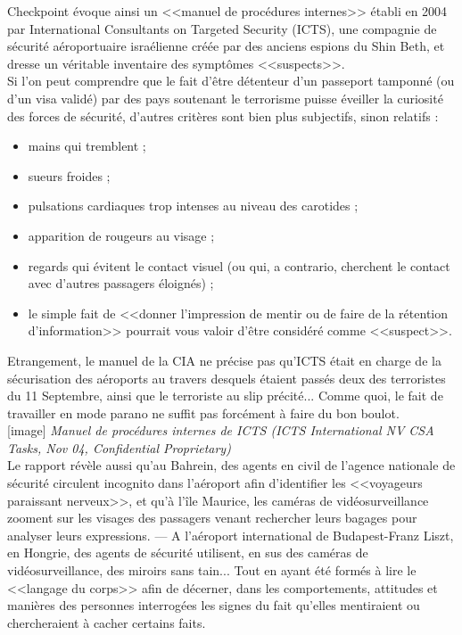 \documentclass[11pt,twoside,a4paper]{article}
\begin{document}
Checkpoint {\'e}voque ainsi un <<manuel de proc{\'e}dures internes>> {\'e}tabli en 2004 par International Consultants on Targeted Security (ICTS), une compagnie de s{\'e}curit{\'e} a{\'e}roportuaire isra{\'e}lienne cr{\'e}{\'e}e par des anciens espions du Shin Beth, et dresse un v{\'e}ritable inventaire des sympt{\^o}mes <<suspects>>. ~\\

Si l'on peut comprendre que le fait d'{\^e}tre d{\'e}tenteur d'un passeport tamponn{\'e} (ou d'un visa valid{\'e}) par des pays soutenant le terrorisme puisse {\'e}veiller la curiosit{\'e} des forces de s{\'e}curit{\'e}, d'autres crit{\`e}res sont bien plus subjectifs, sinon relatifs :
\begin{itemize}
	\item mains qui tremblent ;
	\item sueurs froides ;
	\item pulsations cardiaques trop intenses au niveau des carotides ;
	\item apparition de rougeurs au visage ;
	\item regards qui {\'e}vitent le contact visuel (ou qui, a contrario, cherchent le contact avec d'autres passagers {\'e}loign{\'e}s) ;
	\item le simple fait de <<donner l'impression de mentir ou de faire de la r{\'e}tention d'information>> pourrait vous valoir d'{\^e}tre consid{\'e}r{\'e} comme <<suspect>>.
\end{itemize}

Etrangement, le manuel de la CIA ne pr{\'e}cise pas qu'ICTS {\'e}tait en charge de la s{\'e}curisation des a{\'e}roports au travers desquels {\'e}taient pass{\'e}s deux des terroristes du 11 Septembre, ainsi que le terroriste au slip pr{\'e}cit{\'e}... Comme quoi, le fait de travailler en mode parano ne suffit pas forc{\'e}ment {\`a} faire du bon boulot. ~\\

[image]
\emph{Manuel de proc{\'e}dures internes de ICTS (ICTS International NV CSA Tasks, Nov 04, Confidential Proprietary)} ~\\

Le rapport r{\'e}v{\`e}le aussi qu'au Bahrein, des agents en civil de l'agence nationale de s{\'e}curit{\'e} circulent incognito dans l'a{\'e}roport afin d'identifier les <<voyageurs paraissant nerveux>>, et qu'{\`a} l'{\^i}le Maurice, les cam{\'e}ras de vid{\'e}osurveillance zooment sur les visages des passagers venant rechercher leurs bagages pour analyser leurs expressions. --- A l'a{\'e}roport international de Budapest-Franz Liszt, en Hongrie, des agents de s{\'e}curit{\'e} utilisent, en sus des cam{\'e}ras de vid{\'e}osurveillance, des miroirs sans tain... Tout en ayant {\'e}t{\'e} form{\'e}s {\`a} lire le <<langage du corps>> afin de d{\'e}cerner, dans les comportements, attitudes et mani{\`e}res des personnes interrog{\'e}es les signes du fait qu'elles mentiraient ou chercheraient {\`a} cacher certains faits. ~\\
\end{document}
